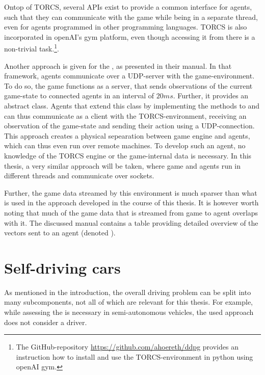 Ontop of TORCS, several APIs exist to provide a common interface for agents, such that they can communicate with the game while being in a separate thread, even for agents programmed in other programming languages. TORCS is also incorporated in openAI's gym platform, even though accessing it from there is a non-trivial task.\footnote{The GitHub-repository \url{https://github.com/ahoereth/ddpg} provides an instruction how to install and use the TORCS-environment in python using openAI gym.}. 

Another approach is given for the , as presented in their manual\cite{loiacono_simulated_2013}. In that framework, agents communicate over a UDP-server with the game-environment. To do so, the game functions as a server, that sends observations of the current game-state to connected agents in an interval of $20ms$. Further, it provides an abstract  class. Agents that extend this class by implementing the methods to  and  can thus communicate as a client with the TORCS-environment, receiving an observation of the game-state and sending their action using a UDP-connection. This approach creates a physical sepearation between game engine and agents, which can thus even run over remote machines. To develop such an agent, no knowledge of the TORCS engine or the game-internal data is necessary. In this thesis, a very similar approach will be taken, where game and agents run in different threads and communicate over sockets. 

Further, the game data streamed by this environment is much sparser than what is used in the approach developed in the course of this thesis. It is however worth noting that much of the game data that is streamed from game to agent overlaps with it. The discussed manual \cite{loiacono_simulated_2013} contains a table providing detailed overview of the vectors sent to an agent (denoted ).

\section{Self-driving cars}

As mentioned in the introduction, the overall driving problem can be split into many subcomponents, not all of which are relevant for this thesis. For example, while assessing the  is necessary in semi-autonomous vehicles, the used approach does not consider a driver. 

